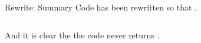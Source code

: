 \begin{frame}{Rewrite: Summary}
  Code has been rewritten so that .

  \begin{columns}
    \begin{column}{0.5\textwidth}
      \usebox\typecaseAbox
    \end{column}
    \begin{column}{0.5\textwidth}  %
      \usebox\typecaseKbox
    \end{column}
  \end{columns}

  And it is clear the the code never returns .

\end{frame}






